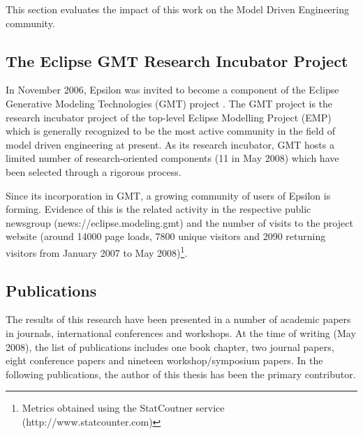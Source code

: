 This section evaluates the impact of this work on the Model Driven Engineering community.

\subsection{The Eclipse GMT Research Incubator Project}
\label{sec:GMT}

In November 2006, Epsilon was invited to become a component of the Eclipse Generative Modeling Technologies (GMT) project \cite{GMT}. The GMT project is the research incubator project of the top-level Eclipse Modelling Project (EMP) \cite{EMP} which is generally recognized to be the most active community in the field of model driven engineering at present. As its research incubator, GMT hosts a limited number of research-oriented components (11 in May 2008) which have been selected through a rigorous process. 

Since its incorporation in GMT, a growing community of users of Epsilon is forming. Evidence of this is the related activity in the respective public newsgroup (news://eclipse.modeling.gmt) and the number of visits to the project website (around 14000 page loads, 7800 unique visitors and 2090 returning visitors from January 2007 to May 2008)\footnote{Metrics obtained using the StatCoutner service (http://www.statcounter.com)}.

\subsection{Publications}
\label{sec:Publications}

The results of this research have been presented in a number of academic papers in journals, international conferences and workshops. At the time of writing (May 2008), the list of publications includes one book chapter, two journal papers, eight conference papers and nineteen workshop/symposium papers. In the following publications, the author of this thesis has been the primary contributor.

